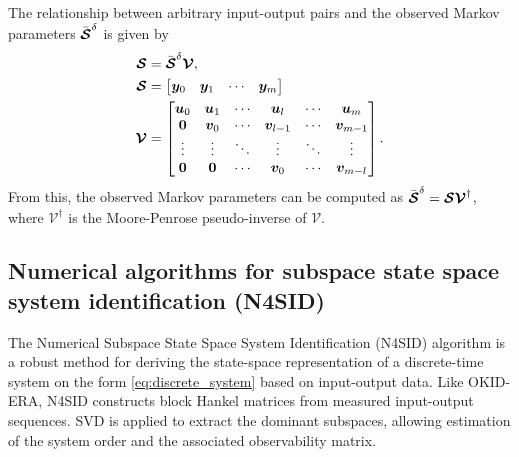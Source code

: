 \documentclass[../main.tex]{subfiles}
\begin{document}
The relationship between arbitrary input-output pairs and the observed Markov parameters $\Bar{\bm{\mathcal{S}}}^{\delta}$ is given by
\begin{equation}
\begin{split}
    \bm{\mathcal{S}} &= \Bar{\bm{\mathcal{S}}}^{\delta}\bm{\mathcal{V}},\\
    \bm{\mathcal{S}} &= \begin{bmatrix}
        \bm{y}_0 & \bm{y}_1 & \cdots & \bm{y}_m
    \end{bmatrix}\\
    \bm{\mathcal{V}} &= \begin{bmatrix}
        \bm{u}_0 & \bm{u}_1 & \cdots & \bm{u}_l & \cdots & \bm{u}_m\\
        \bm{0} & \bm{v}_0 & \cdots & \bm{v}_{l-1} & \cdots & \bm{v}_{m-1}\\
        \vdots & \vdots & \ddots & \vdots & \ddots & \vdots\\
        \bm{0} & \bm{0} & \cdots & \bm{v}_0 & \cdots & \bm{v}_{m-l}
    \end{bmatrix}.
\end{split}
\end{equation}
From this, the observed Markov parameters can be computed as $\Bar{\bm{\mathcal{S}}}^{\delta} = \bm{\mathcal{S}}\bm{\mathcal{V}}^{\dagger}$, where $\bm{\mathcal{V}}^{\dagger}$ is the Moore-Penrose pseudo-inverse of $\bm{\mathcal{V}}$.

\subsection{Numerical algorithms for subspace state space system identification (N4SID)}
\label{sec:n4sid}

The Numerical Subspace State Space System Identification (N4SID) algorithm is a robust method for deriving the state-space representation of a discrete-time system on the form \cref{eq:discrete_system} based on input-output data. Like OKID-ERA, N4SID constructs block Hankel matrices from measured input-output sequences. SVD is applied to extract the dominant subspaces, allowing estimation of the system order and the associated observability matrix.
\end{document}
